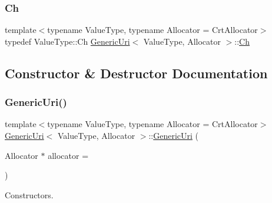 \subsubsection{\texorpdfstring{Ch}{Ch}}
{\footnotesize\ttfamily template$<$typename Value\+Type, typename Allocator = Crt\+Allocator$>$ \\
typedef Value\+Type\+::\+Ch \hyperlink{classGenericUri}{Generic\+Uri}$<$ Value\+Type, Allocator $>$\+::\hyperlink{classGenericUri_a20d0602cff62211d89bc4b25963beeee}{Ch}}



\subsection{Constructor \& Destructor Documentation}
\mbox{\label{classGenericUri_ae9e702382446e760e66e45872567b59e}} 
\subsubsection{\texorpdfstring{Generic\+Uri()}{GenericUri()}\hspace{0.1cm}{\footnotesize\ttfamily [1/6]}}
{\footnotesize\ttfamily template$<$typename Value\+Type, typename Allocator = Crt\+Allocator$>$ \\
\hyperlink{classGenericUri}{Generic\+Uri}$<$ Value\+Type, Allocator $>$\+::\hyperlink{classGenericUri}{Generic\+Uri} (\begin{DoxyParamCaption}\item[{Allocator $\ast$}]{allocator = {} }\end{DoxyParamCaption})\hspace{0.3cm}{\ttfamily [inline]}}



Constructors. 

\mbox{\label{classGenericUri_a188f7f9d11aac1c7647e6f43e05fcbd4}} 
